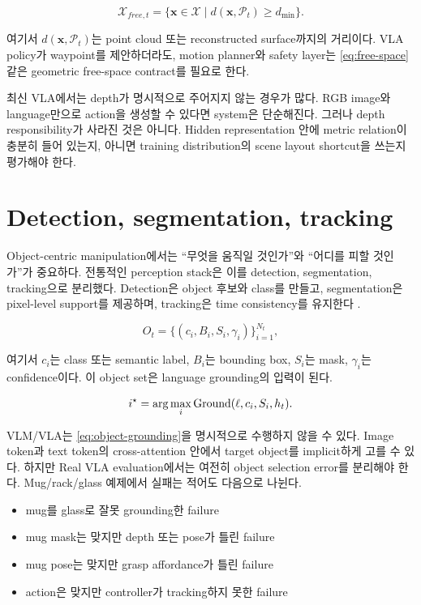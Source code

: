 \begin{equation}
  \mathcal{X}_{free,t}
  =
  \{\bm{x}\in\mathcal{X}\mid d(\bm{x},\mathcal{P}_t) \ge d_{\min}\}.
  \label{eq:free-space}
\end{equation}

여기서 $d(\bm{x},\mathcal{P}_t)$는 point cloud 또는 reconstructed surface까지의 거리이다. VLA policy가 waypoint를 제안하더라도, motion planner와 safety layer는 \cref{eq:free-space} 같은 geometric free-space contract를 필요로 한다.

최신 VLA에서는 depth가 명시적으로 주어지지 않는 경우가 많다. RGB image와 language만으로 action을 생성할 수 있다면 system은 단순해진다. 그러나 depth responsibility가 사라진 것은 아니다. Hidden representation 안에 metric relation이 충분히 들어 있는지, 아니면 training distribution의 scene layout shortcut을 쓰는지 평가해야 한다.

\section{Detection, segmentation, tracking}

Object-centric manipulation에서는 ``무엇을 움직일 것인가''와 ``어디를 피할 것인가''가 중요하다. 전통적인 perception stack은 이를 detection, segmentation, tracking으로 분리했다. Detection은 object 후보와 class를 만들고, segmentation은 pixel-level support를 제공하며, tracking은 time consistency를 유지한다 \cite{ren2015fasterrcnn,he2017maskrcnn}.

\begin{equation}
  O_t =
  \{(c_i, B_i, S_i, \gamma_i)\}_{i=1}^{N_t},
  \label{eq:object-set}
\end{equation}

여기서 $c_i$는 class 또는 semantic label, $B_i$는 bounding box, $S_i$는 mask, $\gamma_i$는 confidence이다. 이 object set은 language grounding의 입력이 된다.

\begin{equation}
  i^\star
  =
  \arg\max_i
  \mathrm{Ground}(\ell, c_i, S_i, h_t).
  \label{eq:object-grounding}
\end{equation}

VLM/VLA는 \cref{eq:object-grounding}을 명시적으로 수행하지 않을 수 있다. Image token과 text token의 cross-attention 안에서 target object를 implicit하게 고를 수 있다. 하지만 Real VLA evaluation에서는 여전히 object selection error를 분리해야 한다. Mug/rack/glass 예제에서 실패는 적어도 다음으로 나뉜다.

\begin{itemize}
  \item mug를 glass로 잘못 grounding한 failure
  \item mug mask는 맞지만 depth 또는 pose가 틀린 failure
  \item mug pose는 맞지만 grasp affordance가 틀린 failure
  \item action은 맞지만 controller가 tracking하지 못한 failure
\end{itemize}

